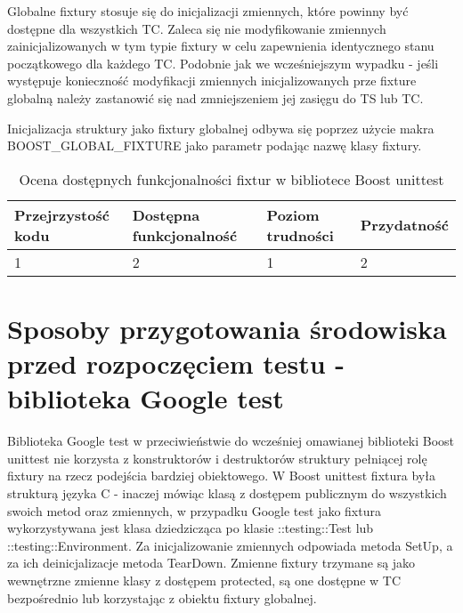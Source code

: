 \documentclass[12pt,a4paper,notitlepage]{report}
\begin{document}
Globalne fixtury stosuje się do inicjalizacji zmiennych, które powinny być dostępne dla wszystkich TC. Zaleca się nie modyfikowanie zmiennych zainicjalizowanych w tym typie fixtury w celu zapewnienia identycznego stanu początkowego dla każdego TC.
Podobnie jak we wcześniejszym wypadku - jeśli występuje konieczność modyfikacji zmiennych inicjalizowanych prze fixture globalną należy zastanowić się nad zmniejszeniem jej zasięgu do TS lub TC.

Inicjalizacja struktury jako fixtury globalnej odbywa się poprzez użycie makra BOOST{\_}GLOBAL{\_}FIXTURE jako parametr podając nazwę klasy fixtury.

			

\begin{center}
			\begin{table}[!ht]
			\caption{Ocena dostępnych funkcjonalności fixtur w bibliotece Boost unittest}
			\label{}
			\begin{tabular}[!hc]{|l|l|l|l|}
		\hline
		Przejrzystość kodu 	&	Dostępna funkcjonalność	&	Poziom trudności	&	Przydatność \\ \hline
		1					&	2						&	1					& 	2  			\\ \hline
			\end{tabular}
			\end{table} 
		\end{center}

\section{Sposoby przygotowania środowiska przed rozpoczęciem testu - biblioteka Google test}

Biblioteka Google test w przeciwieństwie do wcześniej omawianej biblioteki Boost unittest nie korzysta z konstruktorów i destruktorów struktury pełniącej rolę fixtury na rzecz podejścia bardziej obiektowego.
W Boost unittest fixtura była strukturą języka C - inaczej mówiąc klasą z dostępem publicznym do wszystkich swoich metod oraz zmiennych, w przypadku Google test jako fixtura wykorzystywana jest klasa dziedzicząca po klasie ::testing::Test lub ::testing::Environment.
Za inicjalizowanie zmiennych odpowiada metoda SetUp, a za ich deinicjalizacje metoda TearDown.
Zmienne fixtury trzymane są jako wewnętrzne zmienne klasy z dostępem protected, są one dostępne w TC bezpośrednio lub korzystając z obiektu fixtury globalnej.
\end{document}
